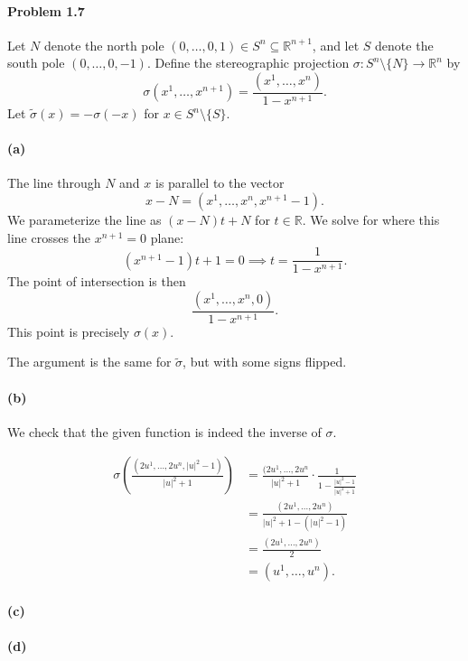 \documentclass[12pt]{article}
\newlength{\myparskip}
\newenvironment{fullbox}{\begin{lrbox}{\savefullbox}\begin{minipage}{\dimexpr\textwidth-2\fboxsep\relax}\setlength{\parskip}{\myparskip}}{\end{minipage}\end{lrbox}\framebox[\textwidth]{\usebox{\savefullbox}}}
\newenvironment{pbox}[1][]{\begin{fullbox}\def\temp{#1}\ifx\temp\empty\else\paragraph{#1}\phantom{}\fi}{\end{fullbox}}
\theoremstyle{definition}
\newcommand{\R}{\mathbb{R}}
\newcommand{\<}{\langle}
\renewcommand{\>}{\rangle}
\newcommand{\seq}{\subseteq}
\begin{document}
\newpage
\begin{pbox}[Problem 1.7]
    Let $N$ denote the north pole $(0, \dots, 0, 1) \in S^n \seq \R^{n+1}$, and let $S$ denote the south pole $(0, \dots, 0, -1)$.
    Define the stereographic projection $\sigma : S^n \setminus \{N\} \to \R^n$ by
    \[
        \sigma(x^1, \dots, x^{n + 1}) = \frac{(x^1, \dots, x^n)}{1 - x^{n+1}}.
    \]
    Let $\tilde{\sigma}(x) = -\sigma(-x)$ for $x \in S^n \setminus \{S\}$. 
\end{pbox}

\begin{pbox}[(a)]
\end{pbox}

The line through $N$ and $x$ is parallel to the vector
\[
    x - N = (x^1, \dots, x^n, x^{n+1} - 1).
\]
We parameterize the line as $(x - N)t + N$ for $t \in \R$.
We solve for where this line crosses the $x^{n + 1} = 0$ plane:
\[
    (x^{n+1} - 1)t + 1 = 0 \implies t = \frac{1}{1 - x^{n + 1}}.
\]
The point of intersection is then
\[
    \frac{(x^1, \dots, x^n, 0)}{1 - x^{n+1}}.
\]
This point is precisely $\sigma(x)$.

The argument is the same for $\tilde{\sigma}$, but with some signs flipped.

\begin{pbox}[(b)]
    
\end{pbox}

We check that the given function is indeed the inverse of $\sigma$.

\begin{align*}
    \sigma\left(\frac{(2u^1, \dots, 2u^n, |u|^2 - 1)}{|u|^2 + 1}\right)
        &= \frac{(2u^1, \dots, 2u^n}{|u|^2 + 1} \cdot \frac{1}{1 - \frac{|u|^2 - 1}{|u|^2 + 1}} \\
        &= \frac{(2u^1, \dots, 2u^n)}{|u|^2 + 1 - (|u|^2 - 1)} \\
        &= \frac{(2u^1, \dots, 2u^n)}{2} \\
        &= (u^1, \dots, u^n).
\end{align*}

\begin{pbox}[(c)]
    
\end{pbox}

\begin{pbox}[(d)]
    
\end{pbox}
\end{document}

